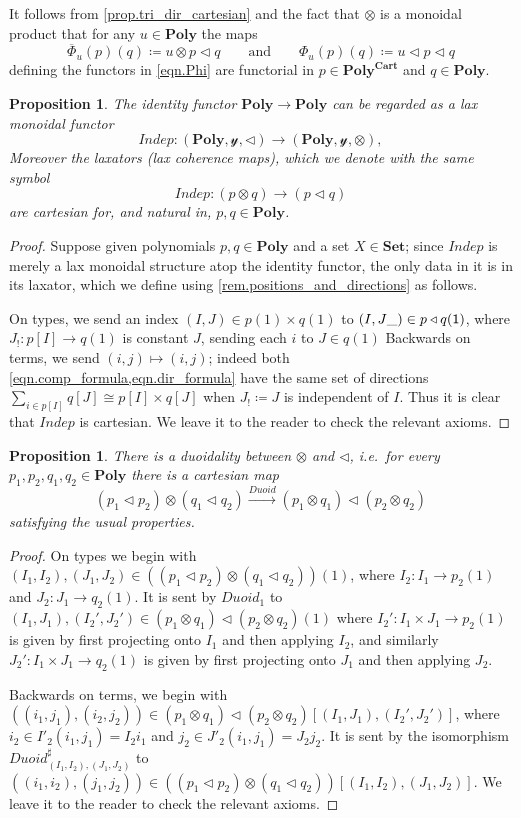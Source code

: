 \documentclass[11pt, one side, article]{memoir}
\theoremstyle{definition}
\theoremstyle{plain}
\newtheorem{proposition}[definitionx]{Proposition}
\newcommand{\Cat}[1]{\mathbf{#1}}%
\newcommand{\Fun}[1]{\mathit{#1}}%
\newcommand{\To}[2][]{\xrightarrow[#1]{#2}}
\newcommand{\ol}[1]{\overline{#1}}
\newcommand{\smset}{\Cat{Set}}
\newcommand{\yon}{\mathcal{y}}
\newcommand{\poly}{\Cat{Poly}}
\newcommand{\polycart}{\poly^{\Cat{Cart}}}
\newcommand{\0}{\textsf{0}}
\newcommand{\1}{\tn{\textsf{1}}}
\newcommand{\tri}{\mathbin{\triangleleft}}
\newcommand{\indep}{\Fun{Indep}}
\newcommand{\duoid}{\Fun{Duoid}}
\newcommand{\qqand}{\qquad\text{and}\qquad}
\begin{document}
It follows from \cref{prop.tri_dir_cartesian} and the fact that $\otimes$ is a monoidal product that for any $u\in\poly$ the maps
\[
	\ol{\Phi}_u(p)(q)\coloneqq u\otimes p\tri q
	\qqand
	\Phi_u(p)(q)\coloneqq u\tri p\tri q
\]
defining the functors in \eqref{eqn.Phi} are functorial in $p\in\polycart$ and $q\in\poly$.

\begin{proposition}\label{prop.indep}
The identity functor $\poly\to\poly$ can be regarded as a lax monoidal functor
\begin{equation}\label{eqn.indep}
	\indep\colon (\poly,\yon,\tri)\to(\poly,\yon,\otimes),
\end{equation}
Moreover the laxators (lax coherence maps), which we denote with the same symbol
\[\indep\colon (p\otimes q)\to (p\tri q)\]
are cartesian for, and natural in, $p,q\in\poly$.
\end{proposition}
\begin{proof}
Suppose given polynomials $p,q\in\poly$ and a set $X\in\smset$; since $\indep$ is merely a lax monoidal structure atop the identity functor, the only data in it is in its laxator, which we define using \cref{rem.positions_and_directions} as follows.

On types, we send an index $(I,J)\in p(1)\times q(1)$ to $(I,J\_)\in p\tri q(\1)$, where $J_!\colon p[I]\to q(1)$ is constant $J$, sending each $i$ to $J\in q(1)$ Backwards on terms, we send $(i,j)\mapsto (i,j)$; indeed both \cref{eqn.comp_formula,eqn.dir_formula} have the same set of directions $\sum_{i\in p[I]}q[J]\cong p[I]\times q[J]$ when $J_!\coloneqq J$ is independent of $I$. Thus it is clear that $\indep$ is cartesian. We leave it to the reader to check the relevant axioms.
\end{proof}

\begin{proposition}\label{prop.duoidal}
There is a duoidality between $\otimes$ and $\tri$, i.e.\ for every $p_1,p_2,q_1,q_2\in\poly$ there is a cartesian map
\[
	(p_1\tri p_2)\otimes(q_1\tri q_2)\To{\duoid} (p_1\otimes q_1)\tri (p_2\otimes q_2)
\]
satisfying the usual properties.
\end{proposition}
\begin{proof}
On types we begin with $(I_1, I_2),(J_1, J_2)\in ((p_1\tri p_2)\otimes(q_1\tri q_2))(1)$, where $I_2\colon I_1\to p_2(1)$ and $J_2\colon J_1\to q_2(1)$. It is sent by $\duoid_1$ to $(I_1,J_1),(I_2',J_2')\in (p_1\otimes q_1)\tri (p_2\otimes q_2)(1)$ where $I_2'\colon I_1\times J_1\to p_2(1)$ is given by first projecting onto $I_1$ and then applying $I_2$, and similarly $J_2'\colon I_1\times J_1\to q_2(1)$ is given by first projecting onto $J_1$ and then applying $J_2$. 

Backwards on terms, we begin with $((i_1,j_1),(i_2,j_2))\in (p_1\otimes q_1)\tri (p_2\otimes q_2)[(I_1,J_1),(I_2',J_2')]$, where $i_2\in I'_2(i_1,j_1)=I_2 i_1$ and $j_2\in J'_2(i_1,j_1)=J_2 j_2$. It is sent by the isomorphism $\duoid^\sharp_{(I_1, I_2),(J_1, J_2)}$ to $((i_1,i_2),(j_1,j_2))\in ((p_1\tri p_2)\otimes(q_1\tri q_2))[(I_1, I_2),(J_1, J_2)]$. We leave it to the reader to check the relevant axioms.
\end{proof}
\end{document}
